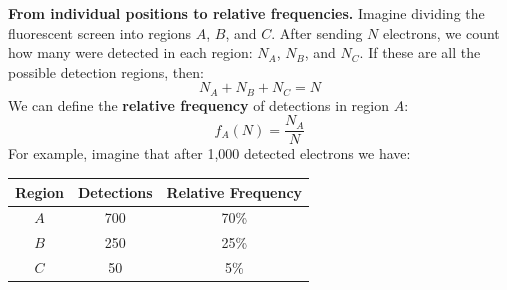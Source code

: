 \highspace
\textcolor{Green3}{ \textbf{From individual positions to relative frequencies.}} Imagine dividing the fluorescent screen into regions $A$, $B$, and $C$. After sending $N$ electrons, we count how many were detected in each region: $N_A$, $N_B$, and $N_C$. If these are all the possible detection regions, then:
\begin{equation*}
    N_A+N_B+N_C=N
\end{equation*}
We can define the \textbf{relative frequency} of detections in region $A$:
\begin{equation*}
    f_A(N)=\frac{N_A}{N}
\end{equation*}
For example, imagine that after 1,000 detected electrons we have:
\begin{center}
    \begin{tabular}{@{} c c c @{}}
        \toprule
        Region & Detections & Relative Frequency \\
        \midrule
        $A$ & 700 & 70\% \\
        $B$ & 250 & 25\% \\
        $C$ & 50 & 5\% \\
        \bottomrule
    \end{tabular}
\end{center}

